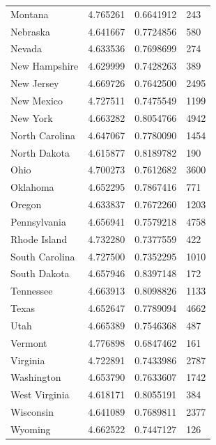 \documentclass[
  english,
  man]{apa6}
\begin{document}
\begin{landscape}
\begin{longtable}[t]{llll}
\addlinespace
Montana & 4.765261 & 0.6641912 & 243\\
Nebraska & 4.641667 & 0.7724856 & 580\\
Nevada & 4.633536 & 0.7698699 & 274\\
New Hampshire & 4.629999 & 0.7428263 & 389\\
New Jersey & 4.669726 & 0.7642500 & 2495\\
\addlinespace
New Mexico & 4.727511 & 0.7475549 & 1199\\
New York & 4.663282 & 0.8054766 & 4942\\
North Carolina & 4.647067 & 0.7780090 & 1454\\
North Dakota & 4.615877 & 0.8189782 & 190\\
Ohio & 4.700273 & 0.7612682 & 3600\\
\addlinespace
Oklahoma & 4.652295 & 0.7867416 & 771\\
Oregon & 4.633837 & 0.7672260 & 1203\\
Pennsylvania & 4.656941 & 0.7579218 & 4758\\
Rhode Island & 4.732280 & 0.7377559 & 422\\
South Carolina & 4.727500 & 0.7352295 & 1010\\
\addlinespace
South Dakota & 4.657946 & 0.8397148 & 172\\
Tennessee & 4.663913 & 0.8098826 & 1133\\
Texas & 4.652647 & 0.7789094 & 4662\\
Utah & 4.665389 & 0.7546368 & 487\\
Vermont & 4.776898 & 0.6847462 & 161\\
\addlinespace
Virginia & 4.722891 & 0.7433986 & 2787\\
Washington & 4.653790 & 0.7633607 & 1742\\
West Virginia & 4.618171 & 0.8055191 & 384\\
Wisconsin & 4.641089 & 0.7689811 & 2377\\
Wyoming & 4.662522 & 0.7447127 & 126\\*
\end{longtable}
\end{landscape}
\endgroup{}

\begingroup\fontsize{12}{14}\selectfont
\end{document}
